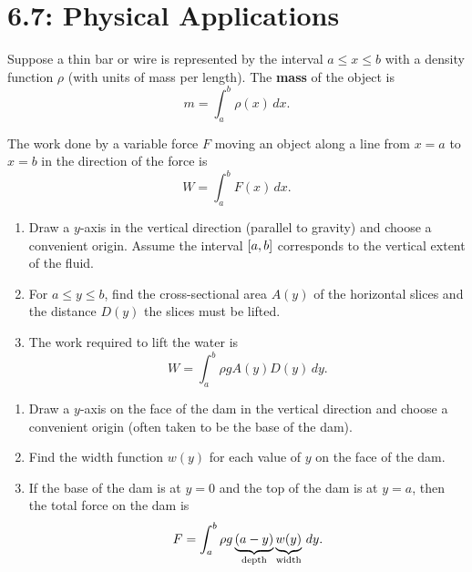 \documentclass[../mathNotesPreamble]{subfiles}
\begin{document}
  \section*{6.7: Physical Applications}

  \begin{defn*}
    Suppose a thin bar or wire is represented by the interval $a\leq x\leq b$ with a density function $\rho$ (with units of mass per length). The \textbf{mass} of the object is
      \[m=\int_a^b \rho(x)\,dx.\]
  \end{defn*}

  \begin{defn*}[Work]
    The work done by a variable force $F$ moving an object along a line from $x=a$ to $x=b$ in the direction of the force is
      \[W=\int_a^b F(x)\,dx.\]
  \end{defn*}


  \begin{thmBox*}
    \begin{enumerate}
      \item 
        Draw a $y$-axis in the vertical direction (parallel to gravity) and choose a convenient origin. Assume the interval ${\left[a,b\right]}$ corresponds to the vertical extent of the fluid.
      \item 
        For $a\leq y\leq b$, find the cross-sectional area $A(y)$ of the horizontal slices and the distance $D(y)$ the slices must be lifted.
      \item 
        The work required to lift the water is
          \[W=\int_a^b \rho gA(y)D(y)\,dy.\]
    \end{enumerate}
  \end{thmBox*}

  \begin{thmBox*}
    \begin{enumerate}
      \item 
        Draw a $y$-axis on the face of the dam in the vertical direction and choose a convenient origin (often taken to be the base of the dam).
      \item 
        Find the width function $w(y)$ for each value of $y$ on the face of the dam.
      \item 
        If the base of the dam is at $y=0$ and the top of the dam is at $y=a$, then the total force on the dam is
          \[F=\int_a^b \rho g\underbrace{(a-y)}_{\textnormal{depth}}\underbrace{w(y)}_{\textnormal{width}}\,dy.\]
    \end{enumerate}
  \end{thmBox*}
\end{document}
